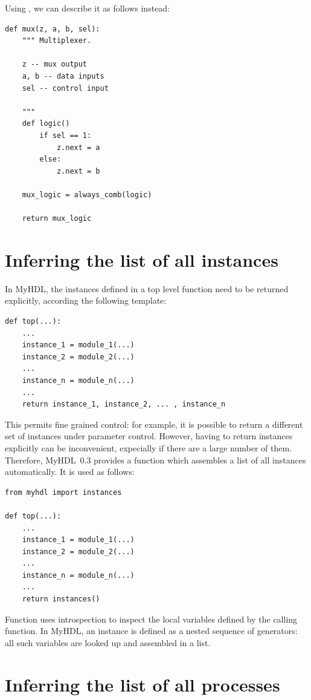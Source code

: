 \documentclass{howto}
\newcommand{\myhdl}{\protect \mbox{MyHDL}}
\begin{document}
Using , we can describe it as follows instead:

\begin{verbatim}
def mux(z, a, b, sel):
    """ Multiplexer.
    
    z -- mux output
    a, b -- data inputs
    sel -- control input

    """
    def logic()
        if sel == 1:
            z.next = a
        else:
            z.next = b

    mux_logic = always_comb(logic)

    return mux_logic
\end{verbatim}


\section{Inferring the list of all instances\label{section-instances}}

In \myhdl{}, the instances defined in a top level function
need to be returned explicitly, according
the following template:

\begin{verbatim}
def top(...):
    ...
    instance_1 = module_1(...)
    instance_2 = module_2(...)
    ...
    instance_n = module_n(...)
    ... 
    return instance_1, instance_2, ... , instance_n
\end{verbatim}


This permits fine grained control: for example, it
is possible to return a different set of instances
under parameter control. 
However, having to return instances explicitly can be inconvenient,
expecially if there are a large number of them. Therefore, \myhdl\ 0.3
provides a function  which assembles a list of
all instances automatically. It is used as follows:

\begin{verbatim}
from myhdl import instances

def top(...):
    ...
    instance_1 = module_1(...)
    instance_2 = module_2(...)
    ...
    instance_n = module_n(...)
    ...
    return instances()
\end{verbatim}

Function  uses introspection to
inspect the local variables defined by the calling
function. In \myhdl {}, an instance is defined as
a nested sequence of generators: all such variables
are looked up and assembled in a list.

\section{Inferring the list of all processes\label{section-processes}}
\end{document}
